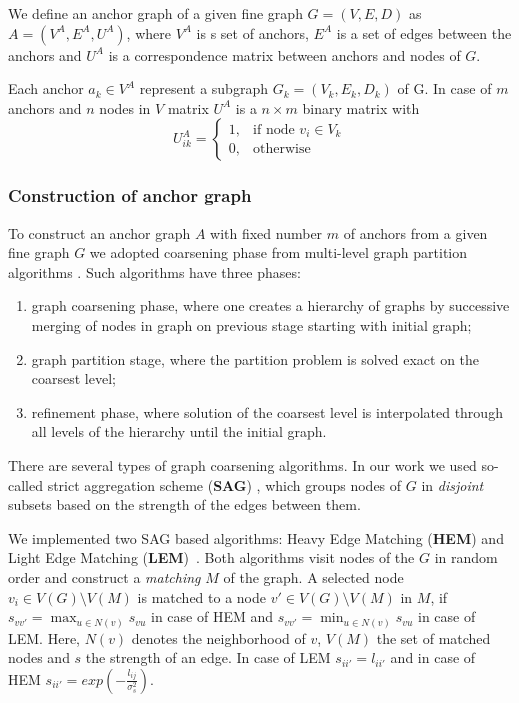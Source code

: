 We define an anchor graph of a given fine graph $G = (V,E,D)$ as $A = (V^A,E^A, U^A)$, where $V^A$ is s set of anchors, $E^{A}$ is a set of edges between the anchors and $U^{A}$ is a correspondence matrix between anchors and nodes of $G$.

Each anchor $a_k\in V^A$ represent a subgraph $G_k = (V_k,E_k, D_k)$ of G. In case of $m$ anchors and $n$ nodes in $V$  matrix $U^{A}$ is a $n\times m$ binary matrix with 
$$U^{A}_{ik} = \begin{cases} 1, & \mbox{if node } v_i\in V_k    \\
	                         0, & \mbox{otherwise} \end{cases} $$	 
	                                                 
\subsubsection{Construction of anchor graph}	                         
To construct an anchor graph $A$ with fixed number $m$ of anchors from a given fine graph $G$ we adopted coarsening phase from multi-level graph partition algorithms \cite{Chevalier09_GP, Safro2012_GC, Karypis95_GP, Hendrickson1995}.
Such algorithms have three phases: 
\begin{enumerate}
	\item graph coarsening phase, where one creates a hierarchy of graphs by successive merging of nodes in graph on previous stage starting with initial graph;
	\item graph partition stage, where the partition problem is solved exact on the coarsest level;
	\item refinement phase, where solution of the coarsest level is interpolated through all levels of the hierarchy until the initial graph.
\end{enumerate}
There are several types of graph coarsening algorithms. In our work we used so-called strict aggregation scheme (\textbf{SAG}) \cite{Chevalier09_GP}, which groups nodes of $G$ in \emph{disjoint} subsets based on the strength of the edges between them. 

We implemented two SAG based algorithms: Heavy Edge Matching (\textbf{HEM}) and Light Edge Matching (\textbf{LEM})~\cite{Chevalier09_GP}. Both algorithms visit nodes of the $G$ in random order and construct a \emph{matching} $M$ of the graph. A selected node $v_i\in V(G)\setminus V(M)$ is matched to a node $v\prime\in V(G)\setminus V(M)$ in $M$, if $s_{vv\prime} = \max_{u\in N(v)} s_{vu}$ in case of HEM and
$s_{vv\prime} = \min_{u\in N(v)} s_{vu}$ in case of LEM. Here, $N(v)$ denotes the neighborhood of $v$, $V(M)$ the set of matched nodes and $s$ the strength of an edge. In case of LEM $s_{ii\prime} = l_{ii\prime}$ and in case of HEM $s_{ii\prime} = exp(-\frac{l_{ij}}{\sigma^2_{s}})$.

